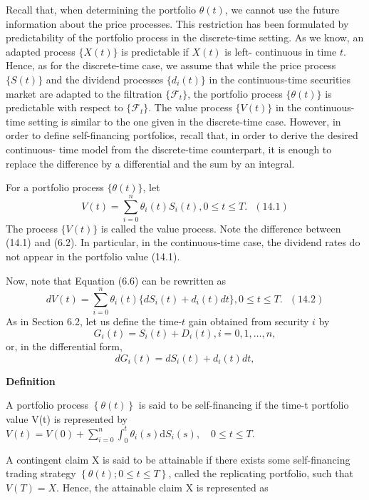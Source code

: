 \documentclass[a4paper,12pt]{article} %
\begin{document}
Recall that, when determining the portfolio $\theta(t)$, we cannot use the future
information about the price processes. This restriction has been formulated
by predictability of the portfolio process in the discrete-time setting. As we
know, an adapted process $\{X(t)\}$ is predictable if $X(t)$ is left-
continuous in time $t$. Hence, as for the discrete-time case, we assume that while
the price process $\{S(t)\}$ and the dividend processes $\{d_i(t)\}$ in the continuous-time securities market are adapted to the filtration $\{\mathcal{F}_t\}$, the portfolio process
$\{\theta(t)\}$ is predictable with respect to $\{\mathcal{F}_t\}$.
The value process $\{V (t)\}$ in the continuous-time setting is similar to the one 
given in the discrete-time case. However,  in order to define self-financing portfolios, recall that, in order to derive the desired continuous-
time model from the discrete-time counterpart, it is enough to replace the
difference by a differential and the sum by an integral.


For a portfolio process $\{\theta(t)\}$, let
$$V(t)=\sum_{i=0}^{n}\theta_i(t)S_i(t),0\le t\le T.\text{ }(14.1)$$
The process $\{V(t)\}$ is called the value process. Note the difference between
(14.1) and (6.2). In particular, in the continuous-time case, the dividend rates
do not appear in the portfolio value (14.1).

Now, note that Equation (6.6) can be rewritten as
$$dV(t)=\sum_{i=0}^{n}\theta_i(t)\{dS_i(t)+d_i(t)dt\},0\le t\le T.\text{ }(14.2)$$
As in Section 6.2, let us define the time-$t$ gain obtained from security $i$ by
$$G_i(t)=S_i(t)+D_i(t),i=0,1,\ldots,n,$$
or, in the differential form,
$$dG_i(t) = dS_i(t) + d_i(t)dt,$$





\textbf{Definition}

A portfolio process $\left \{ \theta (t) \right \}$ is said to be self-financing if the time-t portfolio value V(t) is represented by $V(t) = V(0) + \sum_{i=0}^{n}\int_{0}^{t}\theta _i(s)\mathrm{d}S_i(s),\quad 0\leqslant t\leqslant T$. 


A contingent claim X is said to be attainable if there exists some self-financing trading strategy $\left \{ \theta (t); 0\leqslant t\leqslant T \right \}$, called the replicating portfolio, such that $V(T) = X$. Hence, the attainable claim X is represented as 
\end{document}
